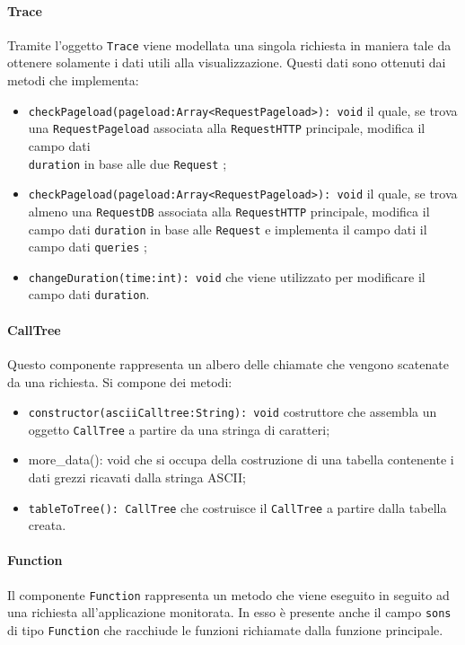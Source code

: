 \paragraph{Trace} \Spazio
Tramite l'oggetto \texttt{Trace} viene modellata una singola richiesta in maniera tale da ottenere solamente i dati utili alla visualizzazione. Questi dati sono ottenuti dai metodi che implementa:
\begin{itemize}
	\item \texttt{checkPageload(pageload:Array<RequestPageload>): void} il quale, se trova una \texttt{RequestPageload} associata alla \texttt{RequestHTTP} principale, modifica il campo dati\\ \texttt{duration} in base alle due \texttt{Request} ;
	\item \texttt{checkPageload(pageload:Array<RequestPageload>): void} il quale, se trova almeno una \texttt{RequestDB} associata alla \texttt{RequestHTTP} principale, modifica il campo dati \texttt{duration} in base alle \texttt{Request} e implementa il campo dati il campo dati \texttt{queries} ;
	\item \texttt{changeDuration(time:int): void} che viene utilizzato per modificare il campo dati \texttt{duration}.
\end{itemize} 

\paragraph{CallTree} \Spazio
Questo componente rappresenta un albero delle chiamate che vengono scatenate da una richiesta. Si compone dei metodi:
\begin{itemize}
	\item \texttt{constructor(asciiCalltree:String): void} costruttore che assembla un oggetto \texttt{CallTree} a partire da una stringa di caratteri;
	\item more\_data(): void che si occupa della costruzione di una tabella contenente i dati grezzi ricavati dalla stringa ASCII;
	\item \texttt{tableToTree(): CallTree} che costruisce il \texttt{CallTree} a partire dalla tabella creata.
\end{itemize}

\paragraph{Function} \Spazio
Il componente \texttt{Function} rappresenta un metodo che viene eseguito in seguito ad una richiesta all'applicazione monitorata. In esso è presente anche il campo \texttt{sons} di tipo \texttt{Function} che racchiude le funzioni richiamate dalla funzione principale.

